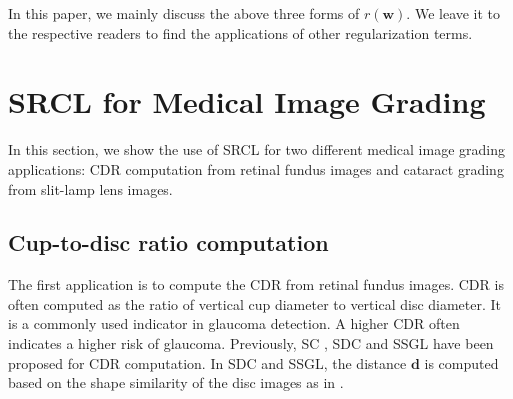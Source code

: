 \documentclass[journal]{IEEEtran}
\begin{document}
 In this paper, we mainly discuss the above three forms of $r(\textbf{w})$.   We leave it to the respective readers to find the applications of other  regularization terms.


\section{SRCL for Medical Image Grading} \label{application}
In this section, we show the use of SRCL for two different medical image grading applications: CDR computation from retinal fundus images and cataract grading from slit-lamp lens images.
\subsection{Cup-to-disc ratio computation}
The first application is to compute the CDR from retinal fundus images. CDR is often computed as the ratio of vertical cup diameter to vertical disc diameter.
 It is a commonly used indicator in glaucoma detection.
  A higher CDR often indicates a higher risk of glaucoma. Previously, %
SC \cite{sparsecoding}, SDC \cite{CJ15}  and SSGL\cite{Cheng:17BOE} have been proposed for CDR computation. In SDC and SSGL,  the distance   $\textbf{d}$ is computed  based on  the shape similarity of the disc images as in \cite{CJ15}.
\end{document}
